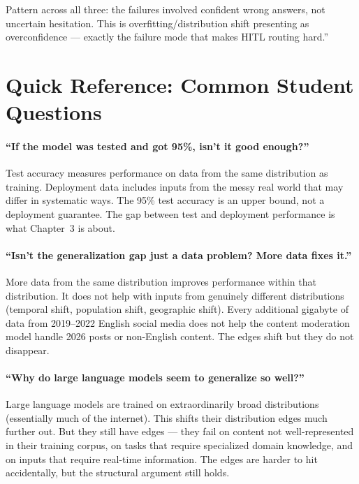 Pattern across all three: the failures involved confident wrong answers, not uncertain hesitation. This is overfitting/distribution shift presenting as overconfidence --- exactly the failure mode that makes HITL routing hard.''

\section{Quick Reference: Common Student Questions}

\paragraph{``If the model was tested and got 95\%, isn't it good enough?''}
Test accuracy measures performance on data from the same distribution as training. Deployment data includes inputs from the messy real world that may differ in systematic ways. The 95\% test accuracy is an upper bound, not a deployment guarantee. The gap between test and deployment performance is what Chapter~3 is about.

\paragraph{``Isn't the generalization gap just a data problem? More data fixes it.''}
More data from the same distribution improves performance within that distribution. It does not help with inputs from genuinely different distributions (temporal shift, population shift, geographic shift). Every additional gigabyte of data from 2019--2022 English social media does not help the content moderation model handle 2026 posts or non-English content. The edges shift but they do not disappear.

\paragraph{``Why do large language models seem to generalize so well?''}
Large language models are trained on extraordinarily broad distributions (essentially much of the internet). This shifts their distribution edges much further out. But they still have edges --- they fail on content not well-represented in their training corpus, on tasks that require specialized domain knowledge, and on inputs that require real-time information. The edges are harder to hit accidentally, but the structural argument still holds.
